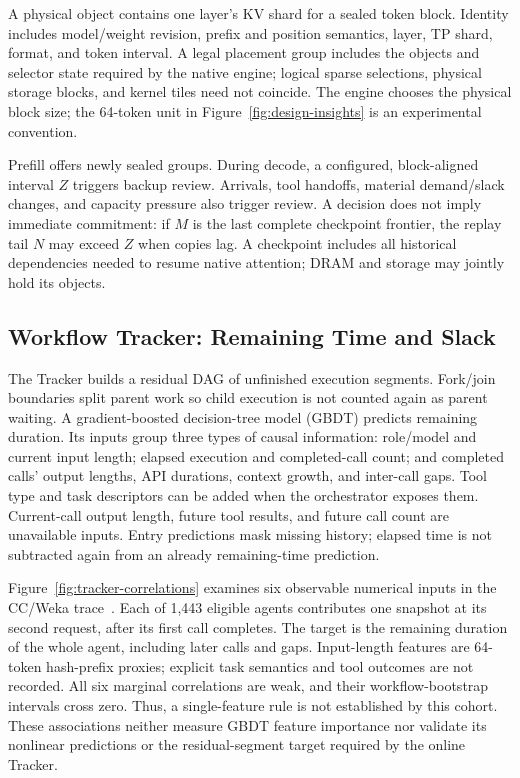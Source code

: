 A physical object contains one layer's KV shard for a sealed token block.
Identity includes model/weight revision, prefix and position semantics,
layer, TP shard, format, and token interval. A legal placement group
includes the objects and selector state required by the native engine;
logical sparse selections, physical storage blocks, and kernel tiles need
not coincide. The engine chooses the physical block size; the 64-token
unit in Figure~\ref{fig:design-insights} is an experimental convention.

Prefill offers newly sealed groups. During decode, a configured,
block-aligned interval $Z$ triggers backup review. Arrivals, tool handoffs,
material demand/slack changes, and capacity pressure also trigger review.
A decision does not imply immediate commitment: if $M$ is the last
complete checkpoint frontier, the replay tail $N$ may exceed $Z$ when
copies lag. A checkpoint includes all historical dependencies needed to
resume native attention; DRAM and storage may jointly hold its objects.

\subsection{Workflow Tracker: Remaining Time and Slack}
\label{sec:workflow-protection}

The Tracker builds a residual DAG of unfinished execution segments.
Fork/join boundaries split parent work so child execution is not counted
again as parent waiting. A gradient-boosted decision-tree model (GBDT)
predicts remaining duration. Its inputs group three types of causal
information: role/model and current input length; elapsed execution and
completed-call count; and completed calls' output lengths, API durations,
context growth, and inter-call gaps. Tool type and task descriptors can
be added when the orchestrator exposes them. Current-call output length,
future tool results, and future call count are unavailable inputs.
Entry predictions mask missing history; elapsed time is not subtracted
again from an already remaining-time prediction.

Figure~\ref{fig:tracker-correlations} examines six observable numerical
inputs in the CC/Weka trace~\cite{semianalysis2026cctraces}. Each of 1,443
eligible agents contributes one snapshot at its second request, after
its first call completes. The target is the remaining duration of the
whole agent, including later calls and gaps. Input-length features are
64-token hash-prefix proxies; explicit task semantics and tool outcomes
are not recorded. All six marginal correlations are weak, and their
workflow-bootstrap intervals cross zero. Thus, a single-feature rule
is not established by this cohort. These associations neither measure
GBDT feature importance nor validate its nonlinear predictions or the
residual-segment target required by the online Tracker.

